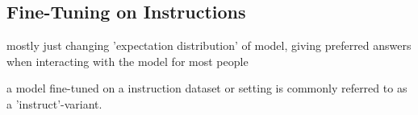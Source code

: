 \subsection{Fine-Tuning on Instructions}\label{sub:instruct}
mostly just changing 'expectation distribution' of model, giving preferred answers when interacting with the model for most people

a model fine-tuned on a instruction dataset or setting is commonly referred to as a 'instruct'-variant.

